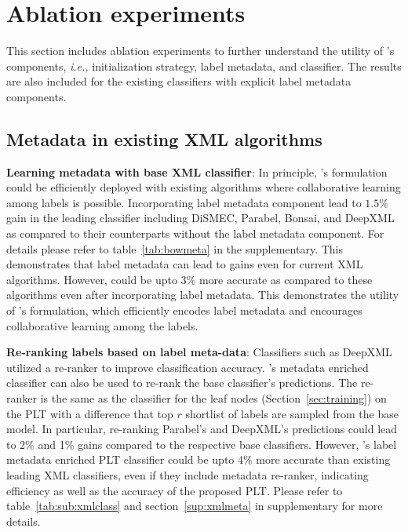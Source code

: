 \section{Ablation experiments}
\label{sec:ablation}

This section includes ablation experiments to further understand the utility of \alg's components, {\it i.e.,} initialization strategy, label metadata, and classifier. The results are also included for the existing classifiers with explicit label metadata components.

\subsection{Metadata in existing XML algorithms}
\textbf{Learning metadata with base XML classifier}: In principle, \alg's formulation could be efficiently deployed with existing algorithms where collaborative learning among labels is possible. Incorporating label metadata component lead to $1.5\%$ gain in the leading classifier including DiSMEC, Parabel, Bonsai, and DeepXML as compared to their counterparts without the label metadata component. For details please refer to table~\ref{tab:bowmeta} in the supplementary. This demonstrates that label metadata can lead to gains even for current XML algorithms. However, \alg could be upto $3\%$ more accurate as compared to these algorithms even after incorporating label metadata. This demonstrates the utility of \alg's formulation, which efficiently encodes label metadata and encourages collaborative learning among the labels.

\textbf{Re-ranking labels based on label meta-data}:
Classifiers such as DeepXML~\citep{dahiya2020} utilized a re-ranker to improve classification accuracy. \alg's metadata enriched classifier can also be used to re-rank the base classifier's predictions. The re-ranker is the same as the \alg classifier for the leaf nodes (Section~\ref{sec:training}) on the PLT with a difference that top $r$ shortlist of labels are sampled from the base model. In particular, re-ranking Parabel's and DeepXML's predictions could lead to 2\% and 1\% gains compared to the respective base classifiers. However, \alg's label metadata enriched PLT classifier could be upto 4\% more accurate than existing leading XML classifiers, even if they include metadata re-ranker, indicating efficiency as well as the accuracy of the proposed PLT. Please refer to table~\ref{tab:sub:xmlclass} and section~\ref{sup:xmlmeta} in supplementary for more details. 

